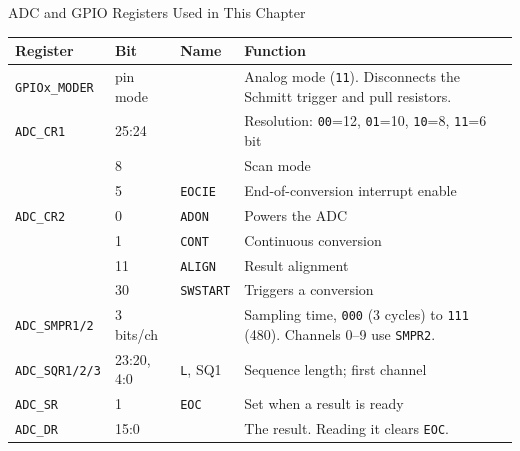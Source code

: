 \documentclass[9pt,aspectratio=169,xcolor=table]{beamer}
\begin{document}
\begin{frame}{ADC and GPIO Registers Used in This Chapter}
    \begin{center}
    {\footnotesize
    \striped
    \begin{tabular}{@{}l l l R{.42\textwidth}@{}}
        \toprule
        \textbf{Register} & \textbf{Bit} & \textbf{Name} & \textbf{Function} \\
        \midrule
        \texttt{GPIOx\_MODER} & pin mode & & Analog mode (\texttt{11}). Disconnects the Schmitt trigger and pull resistors. \\
        \texttt{ADC\_CR1} & 25:24 & & Resolution: \texttt{00}=12, \texttt{01}=10, \texttt{10}=8, \texttt{11}=6 bit \\
                          & 8     & & Scan mode \\
                          & 5     & \texttt{EOCIE} & End-of-conversion interrupt enable \\
        \texttt{ADC\_CR2} & 0     & \texttt{ADON} & Powers the ADC \\
                          & 1     & \texttt{CONT} & Continuous conversion \\
                          & 11    & \texttt{ALIGN} & Result alignment \\
                          & 30    & \texttt{SWSTART} & Triggers a conversion \\
        \texttt{ADC\_SMPR1/2} & 3 bits/ch & & Sampling time, \texttt{000} (3 cycles) to \texttt{111} (480). Channels 0--9 use \texttt{SMPR2}. \\
        \texttt{ADC\_SQR1/2/3} & 23:20, 4:0 & \texttt{L}, SQ1 & Sequence length; first channel \\
        \texttt{ADC\_SR} & 1 & \texttt{EOC} & Set when a result is ready \\
        \texttt{ADC\_DR} & 15:0 & & The result. Reading it clears \texttt{EOC}. \\
        \bottomrule
    \end{tabular}}
    \end{center}
\end{frame}
\end{document}
